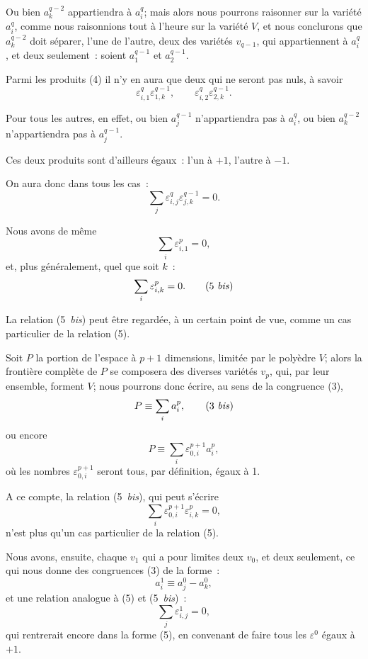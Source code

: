 \documentclass{article}
\begin{document}
Ou bien $a^{q-2}_{k}$ appartiendra à $a^{q}_{i}$; mais alors nous pourrons raisonner sur la variété $a^{q}_{i}$, comme nous raisonnions tout à l'heure sur la variété $V$, et nous conclurons que $a^{q-2}_{k}$ doit séparer, l'une de l'autre, deux des variétés $v_{q-1}$, qui appartiennent à $a^{q}_{i}$, et deux seulement~: soient $a^{q-1}_{1}$ et $a^{q-1}_{2}$.

Parmi les produits (4) il n'y en aura que deux qui ne seront pas nuls, à savoir
\[ \varepsilon^{q}_{i,1} \varepsilon^{q-1}_{1,k}, \qquad \varepsilon^{q}_{i,2} \varepsilon^{q-1}_{2,k}. \]

Pour tous les autres, en effet, ou bien $a^{q-1}_{j}$ n'appartiendra pas à $a^{q}_{i}$, ou bien $a^{q-2}_{k}$ n'appartiendra pas à $a^{q-1}_{j}$.

Ces deux produits sont d'ailleurs égaux~: l'un à $+1$, l'autre à $-1$.

On aura donc dans tous les cas~:
\[ \sum_{j} \varepsilon^{q}_{i,j} \varepsilon^{q-1}_{j,k} = 0. \tag{5} \]


Nous avons de même
\[ \sum_{i} \varepsilon^{p}_{i,1} = 0, \]
et, plus généralement, quel que soit $k$~:
\[ \sum_{i} \varepsilon^{p}_{i,k} = 0. \tag{5 \textit{bis}} \]

La relation (5~\emph{bis}) peut être regardée, à un certain point de vue, comme un cas particulier de la relation (5).

Soit $P$ la portion de l'espace à $p+1$ dimensions, limitée par le polyèdre $V$; alors la frontière complète de $P$ se composera des diverses variétés $v_{p}$, qui, par leur ensemble, forment $V$; nous pourrons donc écrire, au sens de la congruence (3),
\[ P \equiv \sum_{i} a^{p}_{i}, \tag{3 \textit{bis}} \]
ou encore
\[ P \equiv \sum_{i} \varepsilon^{p+1}_{0,i} a^{p}_{i}, \]
où les nombres $\varepsilon^{p+1}_{0,i}$ seront tous, par définition, égaux à 1.

A ce compte, la relation (5~\emph{bis}), qui peut s'écrire
\[ \sum_{i} \varepsilon^{p+1}_{0,i} \varepsilon^{p}_{i,k} = 0, \]
n'est plus qu'un cas particulier de la relation (5).

Nous avons, ensuite, chaque $v_{1}$ qui a pour limites deux $v_{0}$, et deux seulement, ce qui nous donne des congruences (3) de la forme~:
\[ a^{1}_{i} \equiv a^{0}_{j} - a^{0}_{k}, \]
et une relation analogue à (5) et (5~\emph{bis})~:
\[ \sum_{j} \varepsilon^{1}_{i,j} = 0, \]
qui rentrerait encore dans la forme (5), en convenant de faire tous les $\varepsilon^{0}$ égaux à $+1$.
\end{document}

